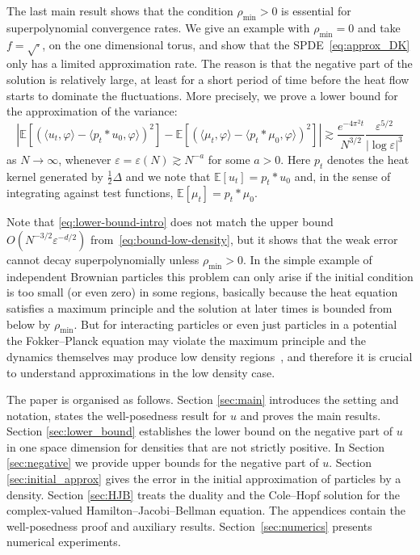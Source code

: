 \documentclass[a4paper,12pt]{article}
\newcommand{\E}{\mathbb{E}}
\begin{document}
The last main result shows that the condition $\rho_{\min}>0$ is essential for superpolynomial convergence rates.
We give an example with $\rho_{\min}=0$ and take $f=\sqrt{\cdot}$,  on the one dimensional torus, and show that the SPDE~\eqref{eq:approx_DK} only has a limited approximation rate. The reason is that the negative part of the solution is relatively large, at least for a short period of time before the heat flow starts to dominate the fluctuations. More precisely, we prove a lower bound for the approximation of the variance:
\begin{equation}\label{eq:lower-bound-intro}
\left|
\E\left[\left(\langle u_t,\varphi\rangle
- \langle p_t \ast u_0,\varphi\rangle\right)^2\right]
-
\E\left[\left(\langle \mu_t,\varphi\rangle
- \langle p_t \ast \mu_0,\varphi\rangle\right)^2\right]
\right|
\gtrsim
\frac{e^{-4\pi^2 t}}{N^{3/2}}
\frac{\varepsilon^{5/2}}{|\log \varepsilon|^{3}}
\end{equation}
as $N\to\infty$, whenever $\varepsilon=\varepsilon(N)\gtrsim N^{-a}$ for some $a>0$. Here  $p_t$ denotes the heat kernel generated by $\tfrac12 \Delta$ and we note that $\E[u_t] = p_t \ast u_0$ and, in the sense of integrating against test functions, $\E[\mu_t] = p_t \ast \mu_0$.

Note that \eqref{eq:lower-bound-intro} does not match the upper bound
$O(N^{-3/2}\varepsilon^{-d/2})$  from~\eqref{eq:bound-low-density}, but it shows that the weak error cannot decay superpolynomially unless $\rho_{\min}>0$. In the simple example of independent Brownian particles this problem can only arise if the initial condition is too small (or even zero) in some regions, basically because the heat equation satisfies a maximum principle and the solution at later times is bounded from below by $\rho_{\min}$. But for interacting particles or even just particles in a potential the Fokker--Planck equation may violate the maximum principle and the dynamics themselves may produce low density regions~\cite{Wehlitz2025}, and therefore it is crucial to understand approximations in the low density case. %

The paper is organised as follows. Section \ref{sec:main} introduces the setting and notation, states the well-posedness result for $u$ and proves the main results. Section \ref{sec:lower_bound} establishes the lower bound on the negative part of $u$ in one space dimension for densities that are not strictly positive. In Section \ref{sec:negative} we provide upper bounds for the negative part of $u$. Section \ref{sec:initial_approx} gives the error in the initial approximation of particles by a density. 
Section \ref{sec:HJB} treats the duality and the Cole--Hopf solution for the complex-valued Hamilton--Jacobi--Bellman equation.
The appendices contain the well-posedness proof and auxiliary results. Section~\ref{sec:numerics} presents numerical experiments.
\end{document}
